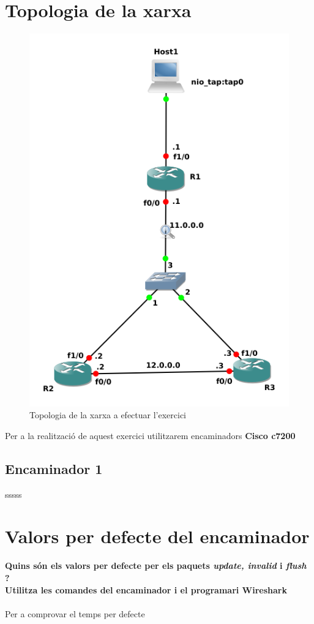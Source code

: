 \documentclass[10pt]{article}
\begin{document}
\section{Topologia de la xarxa}
\begin{figure}[H]
\begin{center}
\includegraphics[scale=0.5]{Images/screenshot.png}
\caption{Topologia de la xarxa a efectuar l'exercici}
\end{center}
\end{figure}
Per a la realització de aquest exercici utilitzarem encaminadors \textbf{Cisco c7200} 
\subsection{Encaminador 1}
sssss
\section{Valors per defecte del encaminador}
\textbf{Quins són els valors per defecte per els paquets \textit{update, invalid} i \textit{flush} ?\\Utilitza les comandes del encaminador i el programari Wireshark}
\\\\
Per a comprovar el temps per defecte
\end{document}
